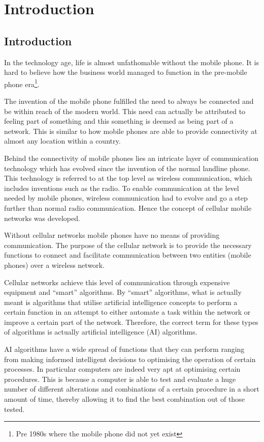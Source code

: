 \chapter{Introduction}
\section{Introduction}
In the technology age, life is almost unfathomable without the mobile phone. It is hard to believe how the business world managed to function in the pre-mobile phone era\footnote{Pre 1980s where the mobile phone did not yet exist}. 

The invention of the mobile phone fulfilled the need to always be connected and be within reach of the modern world. This need can actually be attributed to feeling part of something and this something is deemed as being part of a network. This is similar to how mobile phones are able to provide connectivity at almost any location within a country.

Behind the connectivity of mobile phones lies an intricate layer of communication technology which has evolved since the invention of the normal landline phone. This technology is referred to at the top level as wireless communication, which includes inventions such as the radio. To enable communication at the level needed by mobile phones, wireless communication had to evolve and go a step further than normal radio communication. Hence the concept of cellular mobile networks was developed.

Without cellular networks mobile phones have no means of providing communication. The purpose of the cellular network is to provide the necessary functions to connect and facilitate communication between two entities (mobile phones) over a wireless network. 

Cellular networks achieve this level of communication through expensive equipment and ``smart'' algorithms. By ``smart'' algorithms, what is actually meant is algorithms that utilise artificial intelligence concepts to perform a certain function in an attempt to either automate a task within the network or improve a certain part of the network. Therefore, the correct term for these types of algorithms is actually artificial intelligence (AI) algorithms.

AI algorithms have a wide spread of functions that they can perform ranging from making informed intelligent decisions to optimising the operation of certain processes. In particular computers are indeed very apt at optimising certain procedures. This is because a computer is able to test and evaluate a huge number of different alterations and combinations of a certain procedure in a short amount of time, thereby allowing it to find the best combination out of those tested.

